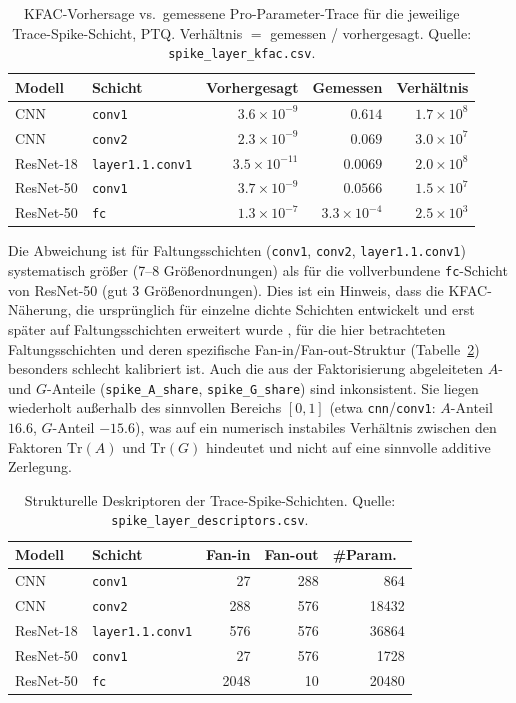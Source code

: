\begin{table}[t]
\centering
\small
\caption{KFAC-Vorhersage vs.\ gemessene Pro-Parameter-Trace für die jeweilige Trace-Spike-Schicht, PTQ. Verhältnis $=$ gemessen / vorhergesagt. Quelle: \texttt{spike\_layer\_kfac.csv}.}
\label{tab:kfac}
\begin{tabular}{llrrr}
\toprule
Modell & Schicht & Vorhergesagt & Gemessen & Verhältnis \\
\midrule
CNN & \texttt{conv1} & $3.6\times10^{-9}$ & $0.614$ & $1.7\times10^{8}$ \\
CNN & \texttt{conv2} & $2.3\times10^{-9}$ & $0.069$ & $3.0\times10^{7}$ \\
ResNet-18 & \texttt{layer1.1.conv1} & $3.5\times10^{-11}$ & $0.0069$ & $2.0\times10^{8}$ \\
ResNet-50 & \texttt{conv1} & $3.7\times10^{-9}$ & $0.0566$ & $1.5\times10^{7}$ \\
ResNet-50 & \texttt{fc} & $1.3\times10^{-7}$ & $3.3\times10^{-4}$ & $2.5\times10^{3}$ \\
\bottomrule
\end{tabular}
\end{table}

Die Abweichung ist für Faltungsschichten (\texttt{conv1}, \texttt{conv2}, \texttt{layer1.1.conv1}) systematisch größer (7--8 Größenordnungen) als für die vollverbundene \texttt{fc}-Schicht von ResNet-50 (gut 3 Größenordnungen). Dies ist ein Hinweis, dass die KFAC-Näherung, die ursprünglich für einzelne dichte Schichten entwickelt \citep{martens_kfac_2015} und erst später auf Faltungsschichten erweitert wurde \citep{grosse_kfc_2016}, für die hier betrachteten Faltungsschichten und deren spezifische Fan-in/Fan-out-Struktur (Tabelle~\ref{tab:descriptors}) besonders schlecht kalibriert ist. Auch die aus der Faktorisierung abgeleiteten $A$- und $G$-Anteile (\texttt{spike\_A\_share}, \texttt{spike\_G\_share}) sind inkonsistent. Sie liegen wiederholt außerhalb des sinnvollen Bereichs $[0,1]$ (etwa \texttt{cnn}/\texttt{conv1}: $A$-Anteil $16.6$, $G$-Anteil $-15.6$), was auf ein numerisch instabiles Verhältnis zwischen den Faktoren $\mathrm{Tr}(A)$ und $\mathrm{Tr}(G)$ hindeutet und nicht auf eine sinnvolle additive Zerlegung.

\begin{table}[t]
\centering
\footnotesize
\caption{Strukturelle Deskriptoren der Trace-Spike-Schichten. Quelle: \texttt{spike\_layer\_descriptors.csv}.}
\label{tab:descriptors}
\begin{tabular}{p{1.55cm}p{1.75cm}rrr}
\toprule
Modell & Schicht & Fan-in & Fan-out & \#Param.\ \\
\midrule
CNN & \texttt{conv1} & 27 & 288 & 864 \\
CNN & \texttt{conv2} & 288 & 576 & 18432 \\
ResNet-18 & \texttt{layer1.1.\allowbreak conv1} & 576 & 576 & 36864 \\
ResNet-50 & \texttt{conv1} & 27 & 576 & 1728 \\
ResNet-50 & \texttt{fc} & 2048 & 10 & 20480 \\
\bottomrule
\end{tabular}
\end{table}

